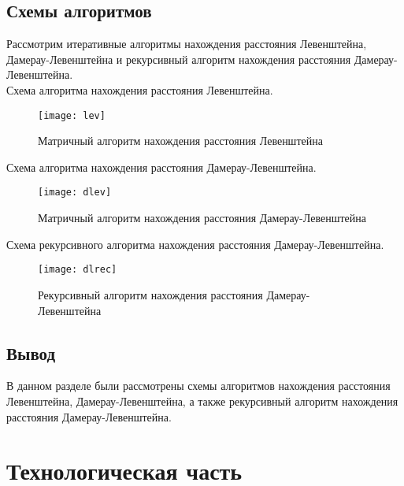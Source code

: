 \documentclass[a4paper, 14pt]{article}
\begin{document}
	\subsection{Схемы алгоритмов}
	
	Рассмотрим итеративные алгоритмы нахождения расстояния Левенштейна, Дамерау-Левенштейна и рекурсивный алгоритм нахождения расстояния Дамерау-Левенштейна.\\
	
	Схема алгоритма нахождения расстояния Левенштейна. \\
	\begin{figure}[H]
        	\begin{center}
        		{\texttt{[image: lev]}}
        		\caption{Матричный алгоритм нахождения расстояния Левенштейна}
        		\label{fig:schema_lev_matr}
        	\end{center}
        \end{figure}
	
	Схема алгоритма нахождения расстояния Дамерау-Левенштейна. \\
		\begin{figure}[H]
        	\begin{center}
        		{\texttt{[image: dlev]}}
        		\caption{Матричный алгоритм нахождения расстояния Дамерау-Левенштейна}
        	\end{center}
        \end{figure}
	
	\newpage
	Схема рекурсивного алгоритма нахождения расстояния Дамерау-Левенштейна. \\
	\begin{figure}[H]
        	\begin{center}
        		{\texttt{[image: dlrec]}}
        		\caption{Рекурсивный алгоритм нахождения расстояния Дамерау-Левенштейна}
        	\end{center}
        \end{figure}
	
	\subsection{Вывод}
	
	В данном разделе были рассмотрены схемы алгоритмов нахождения расстояния Левенштейна, Дамерау-Левенштейна, а также рекурсивный алгоритм нахождения расстояния Дамерау-Левенштейна.

	\newpage
	\section{Технологическая часть}
	
\end{document}
